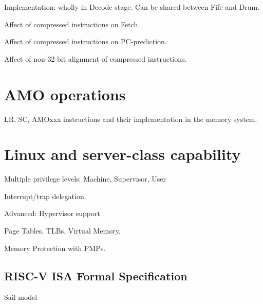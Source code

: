 Implementation: wholly in Decode stage.  Can be shared between Fife and Drum.

Affect of compressed instructions on Fetch.

Affect of compressed instructions on PC-prediction.

Affect of non-32-bit alignment of compressed instructions.


\section{AMO operations}

LR, SC, AMOxxx instructions and their implementation in the memory system.


\section{Linux and server-class capability}

Multiple privilege levels: Machine, Supervisor, User

Interrupt/trap delegation.

Advanced: Hypervisor support

Page Tables, TLBs, Virtual Memory.

Memory Protection with PMPs.


\subsection{RISC-V ISA Formal Specification}

Sail model

